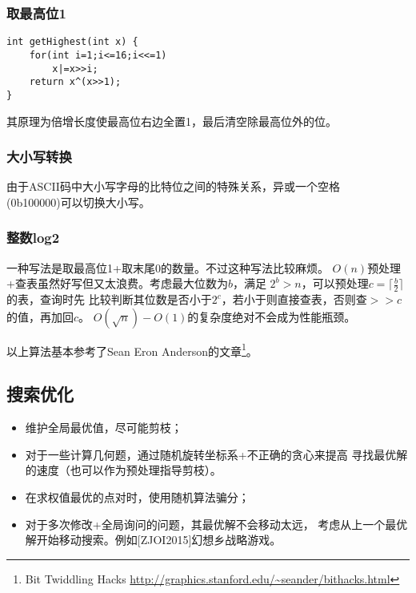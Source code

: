 \subsubsection{取最高位1}
\begin{lstlisting}
int getHighest(int x) {
    for(int i=1;i<=16;i<<=1)
        x|=x>>i;
    return x^(x>>1);
}
\end{lstlisting}

其原理为倍增长度使最高位右边全置1，最后清空除最高位外的位。
\subsubsection{大小写转换}
由于ASCII码中大小写字母的比特位之间的特殊关系，异或一个空格\\(0b100000)可以切换大小写。

\subsubsection{整数log2}
一种写法是取最高位1+取末尾0的数量。不过这种写法比较麻烦。
$O(n)$预处理+查表虽然好写但又太浪费。考虑最大位数为$b$，满足
$2^b>n$，可以预处理$c=\lceil \frac{b}{2}\rceil$的表，查询时先
比较判断其位数是否小于$2^c$，若小于则直接查表，否则查$>>c$的值，再加回$c$。
$O(\sqrt{n})-O(1)$的复杂度绝对不会成为性能瓶颈。

以上算法基本参考了Sean Eron Anderson的文章\footnote{
    Bit Twiddling Hacks
    \url{http://graphics.stanford.edu/\~seander/bithacks.html}
}。
\subsection{搜索优化}
\begin{itemize}
    \item 维护全局最优值，尽可能剪枝；
    \item 对于一些计算几何题，通过随机旋转坐标系+不正确的贪心来提高
    寻找最优解的速度（也可以作为预处理指导剪枝）。
    \item 在求权值最优的点对时，使用随机算法骗分；
    \item 对于多次修改+全局询问的问题，其最优解不会移动太远，
    考虑从上一个最优解开始移动搜索。例如[ZJOI2015]幻想乡战略游戏。
\end{itemize}

